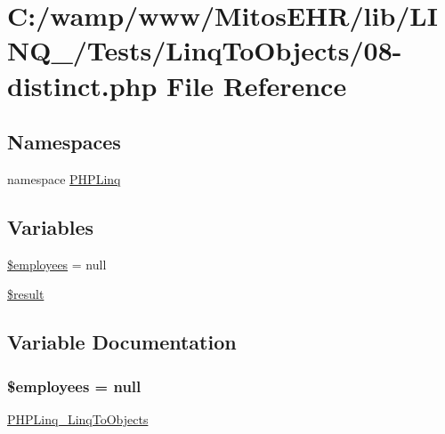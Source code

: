 \hypertarget{_linq_to_objects_208-distinct_8php}{\section{\-C\-:/wamp/www/\-Mitos\-E\-H\-R/lib/\-L\-I\-N\-Q\-\_/\-Tests/\-Linq\-To\-Objects/08-\/distinct.php \-File \-Reference}
\label{_linq_to_objects_208-distinct_8php}
}
\subsection*{\-Namespaces}
\begin{DoxyCompactItemize}
\item 
namespace \hyperlink{namespace_p_h_p_linq}{\-P\-H\-P\-Linq}
\end{DoxyCompactItemize}
\subsection*{\-Variables}
\begin{DoxyCompactItemize}
\item 
\hyperlink{_linq_to_objects_208-distinct_8php_a598c06abe9d65a9d2990e39693ce2c27}{\$employees} = null
\item 
\hyperlink{_linq_to_objects_208-distinct_8php_a112ef069ddc0454086e3d1e6d8d55d07}{\$result}
\end{DoxyCompactItemize}


\subsection{\-Variable \-Documentation}
\hypertarget{_linq_to_objects_208-distinct_8php_a598c06abe9d65a9d2990e39693ce2c27}{
\subsubsection[{\$employees}]{\setlength{\rightskip}{0pt plus 5cm}\$employees = null}}\label{_linq_to_objects_208-distinct_8php_a598c06abe9d65a9d2990e39693ce2c27}
\hyperlink{class_p_h_p_linq___linq_to_objects}{\-P\-H\-P\-Linq\-\_\-\-Linq\-To\-Objects} 

